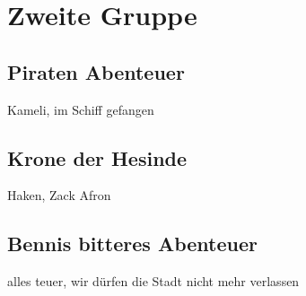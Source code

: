 \chapter{Zweite Gruppe}
\section{Piraten Abenteuer}
Kameli, im Schiff gefangen
\section{Krone der Hesinde}
Haken, Zack Afron
\section{Bennis bitteres Abenteuer}
alles teuer, wir dürfen die Stadt nicht mehr verlassen